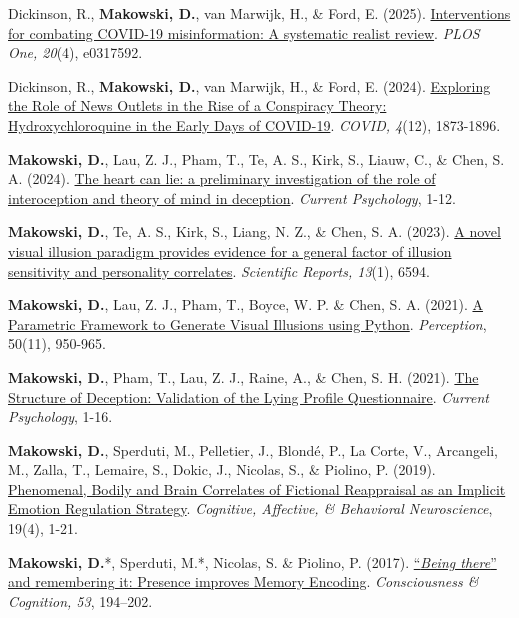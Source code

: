 \documentclass[11pt,a4paper,]{awesome-cv}
\begin{document}
Dickinson, R., \textbf{Makowski, D.}, van Marwijk, H., \& Ford, E.
(2025).
\href{https://doi.org/10.1371/journal.pone.0317592}{Interventions for
combating COVID-19 misinformation: A systematic realist review}.
\emph{PLOS One, 20}(4), e0317592.

Dickinson, R., \textbf{Makowski, D.}, van Marwijk, H., \& Ford, E.
(2024). \href{https://www.mdpi.com/2673-8112/4/12/132}{Exploring the
Role of News Outlets in the Rise of a Conspiracy Theory:
Hydroxychloroquine in the Early Days of COVID-19}. \emph{COVID, 4}(12),
1873-1896.

\textbf{Makowski, D.}, Lau, Z. J., Pham, T., Te, A. S., Kirk, S., Liauw,
C., \& Chen, S. A. (2024).
\href{https://link.springer.com/article/10.1007/s12144-024-06890-w}{The
heart can lie: a preliminary investigation of the role of interoception
and theory of mind in deception}. \emph{Current Psychology}, 1-12.

\textbf{Makowski, D.}, Te, A. S., Kirk, S., Liang, N. Z., \& Chen, S. A.
(2023). \href{https://doi.org/10.1038/s41598-023-33148-5}{A novel visual
illusion paradigm provides evidence for a general factor of illusion
sensitivity and personality correlates}. \emph{Scientific Reports,
13}(1), 6594.

\textbf{Makowski, D.}, Lau, Z. J., Pham, T., Boyce, W. P. \& Chen, S. A.
(2021).
\href{https://dominiquemakowski.github.io/publication/makowski2021parametric/makowski2021parametric.pdf}{A
Parametric Framework to Generate Visual Illusions using Python}.
\emph{Perception}, 50(11), 950-965.

\textbf{Makowski, D.}, Pham, T., Lau, Z. J., Raine, A., \& Chen, S. H.
(2021).
\href{https://dominiquemakowski.github.io/publication/makowski2021structure/makowski2021structure.pdf}{The
Structure of Deception: Validation of the Lying Profile Questionnaire}.
\emph{Current Psychology}, 1-16.

\textbf{Makowski, D.}, Sperduti, M., Pelletier, J., Blondé, P., La
Corte, V., Arcangeli, M., Zalla, T., Lemaire, S., Dokic, J., Nicolas,
S., \& Piolino, P. (2019).
\href{https://dominiquemakowski.github.io/publication/makowski2019phenomenal/makowski2019phenomenal.pdf}{Phenomenal,
Bodily and Brain Correlates of Fictional Reappraisal as an Implicit
Emotion Regulation Strategy}. \emph{Cognitive, Affective, \& Behavioral
Neuroscience}, 19(4), 1-21.

\textbf{Makowski, D.}*, Sperduti, M.*, Nicolas, S. \& Piolino, P.
(2017).
\href{https://dominiquemakowski.github.io/publication/makowski2017being/makowski2017being.pdf}{``\emph{Being
there}'' and remembering it: Presence improves Memory Encoding}.
\emph{Consciousness \& Cognition, 53}, 194--202.
\end{document}
